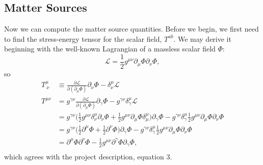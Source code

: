 \documentclass[12pt]{article}
\numberwithin{equation}{section}
\newcommand{\Lagr}{\mathcal{L}}
\begin{document}
\subsection{Matter Sources}
Now we can compute the matter source quantities.  Before we begin, we first need to find the stress-energy tensor for the scalar field, $T^{ab}$.  We may derive it beginning with the well-known Lagrangian of a massless scalar field $\Phi$:
\begin{equation}
\Lagr = \frac{1}{2} g^{\mu \nu} \partial_\mu \Phi \partial_\nu \Phi,
\end{equation}
so
\begin{equation}
\begin{aligned}
T^{\mu}_{~\nu} &\equiv \frac{\partial \Lagr}{\partial (\partial_\mu \Phi)} \partial_\nu \Phi - \delta^\mu_\nu \Lagr \\
T^{\mu \nu} &= g^{\gamma \nu} \frac{\partial \Lagr}{\partial (\partial_\mu \Phi)} \partial_\gamma \Phi - g^{\gamma \nu} \delta^\mu_\gamma \Lagr \\
&= g^{\gamma \nu} \Big( \frac{1}{2} g^{\mu \nu} \delta^\mu_\nu \partial_\nu \Phi + \frac{1}{2} g^{\mu \nu} \partial_\mu \Phi \delta^\mu_\mu \Big) \partial_\gamma \Phi	 - g^{\gamma \nu} \delta^\mu_\gamma \frac{1}{2} g^{\mu \nu} \partial_\mu \Phi \partial_\nu \Phi \\
&= g^{\gamma \nu} \Big( \frac{1}{2} \partial^\mu \Phi + \frac{1}{2} \partial^\nu \Phi \Big) \partial_\gamma \Phi - g^{\gamma \nu} \delta^\mu_\gamma \frac{1}{2} g^{\mu \nu} \partial_\mu \Phi \partial_\nu \Phi \\
&= \partial^\mu \Phi \partial^\nu \Phi - \frac{1}{2} g^{\mu \nu} \partial^\gamma \Phi \partial_\gamma \Phi, \\
\end{aligned}
\end{equation}
which agrees with the project description, equation 3.
\end{document}
